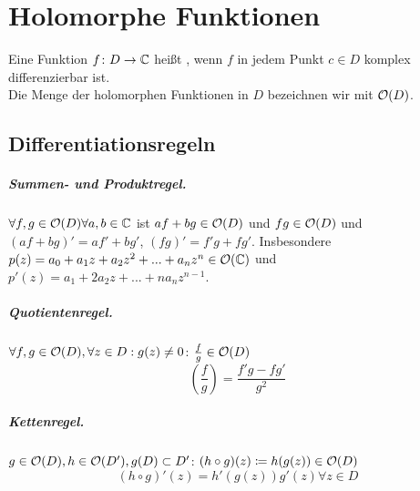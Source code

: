 \chapter{Holomorphe Funktionen}
\begin{definition}
	Eine Funktion $ f\colon D\rightarrow\mathbb{C} $ hei\ss t , wenn $ f $ in jedem Punkt $ c\in D $ komplex differenzierbar ist.\\
	Die Menge der holomorphen Funktionen in $ D $ bezeichnen wir mit $ \mathcal O(D) $.
\end{definition}
\section*{Differentiationsregeln}
\paragraph{Summen- und Produktregel.} $ \forall f,g\in\mathcal O(D) \forall a,b\in\mathbb{C}$ ist $ af+bg \in\mathcal O(D) $ und $ fg\in\mathcal O(D) $ und $ (af+bg)'=af'+bg' $, $ (fg)'=f'g+fg' $. Insbesondere $ p(z)=a_0+a_1z+a_2z^2+...+a_nz^n\in\mathcal O(\mathbb{C}) $ und $ p'(z)=a_1+2a_2z+...+na_nz^{n-1} $.
\paragraph{Quotientenregel.} $ \forall f,g\in\mathcal O(D), \forall z\in D: g(z)\neq 0 $: $\frac{f}{g}\in\mathcal O(D)$
\[ \left(\frac{f}{g}\right)=\frac{f'g-fg'}{g^2} \]
\paragraph{Kettenregel.} $ g\in\mathcal O(D), h\in\mathcal O(D'), g(D)\subset D' $: $ (h\circ g)(z)\coloneqq h(g(z))\in\mathcal O(D) $
\[ (h\circ g)'(z)=h'(g(z))g'(z)\forall z\in D \]
\newpage
